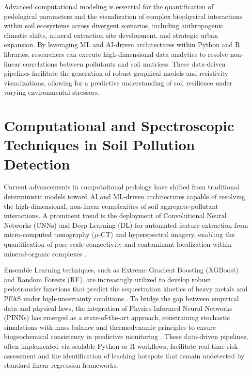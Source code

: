 \documentclass[sn-mathphys-num]{sn-jnl}
\begin{document}
Advanced computational modeling is essential for the quantification of
pedological parameters and the visualization of complex biophysical
interactions within soil ecosystems across divergent scenarios, including
anthropogenic climatic shifts, mineral extraction site development, and
strategic urban expansion. By leveraging ML and AI-driven architectures within
Python and R libraries, researchers can execute high-dimensional data analytics
to resolve non-linear correlations between pollutants and soil matrices. These
data-driven pipelines facilitate the generation of robust graphical models and
resistivity visualizations, allowing for a predictive understanding of soil
resilience under varying environmental stressors.

\section{Computational and Spectroscopic Techniques in Soil Pollution
    Detection}\label{sec3}

Current advancements in computational pedology have shifted from traditional
deterministic models toward AI and ML-driven architectures capable of
resolving the high-dimensional, non-linear complexities of soil
aggregate-pollutant interactions. A prominent trend is the deployment of
Convolutional Neural Networks (CNNs) and Deep Learning (DL) for automated
feature extraction from micro-computed tomography ($\mu$-CT) and hyperspectral
imagery, enabling the quantification of pore-scale connectivity and
contaminant localization within mineral-organic complexes
\cite{Demiral2026,Fan2025}.

Ensemble Learning techniques, such as Extreme Gradient Boosting (XGBoost) and
Random Forests (RF), are increasingly utilized to develop robust pedotransfer
functions that predict the sequestration kinetics of heavy metals and PFAS
under high-uncertainty conditions \cite{Sahab2025,Wadoux2024}. To bridge the
gap between empirical data and physical laws, the integration of
Physics-Informed Neural Networks (PINNs) has emerged as a state-of-the-art
approach, constraining stochastic simulations with mass-balance and
thermodynamic principles to ensure biogeochemical consistency in predictive
monitoring \cite{Karpatne2024,Nguyen2025}. These data-driven pipelines, often
implemented via scalable Python or R workflows, facilitate real-time risk
assessment and the identification of leaching hotspots that remain undetected
by standard linear regression frameworks.
\end{document}
